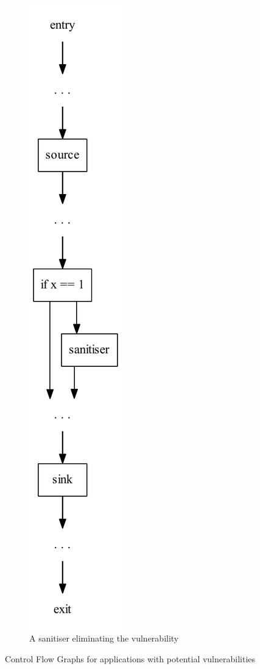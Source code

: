 \begin{figure}
\begin{subfigure}[b]{0.5\textwidth}
  \end{subfigure}
  ~
  \begin{subfigure}[b]{0.5\textwidth}
    \centering
    \includegraphics[scale=0.8]{figures/dot_files/sanitised_with_flow.pdf}
    \caption{A sanitiser eliminating the vulnerability}
    \label{vulnerabilities_sanitised}
  \end{subfigure}
  
  \caption{Control Flow Graphs for applications with potential vulnerabilities}
\end{figure}

